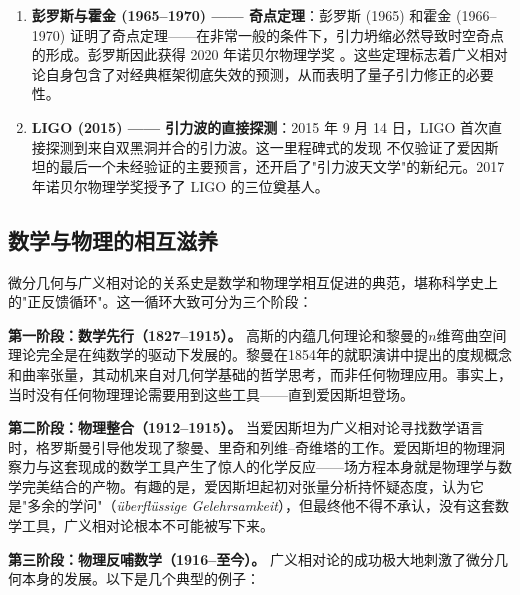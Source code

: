 \begin{enumerate}
    \item \textbf{彭罗斯与霍金 (1965--1970) —— 奇点定理}：彭罗斯 (1965) 和霍金 (1966--1970) 证明了奇点定理——在非常一般的条件下，引力坍缩必然导致时空奇点的形成。彭罗斯因此获得 2020 年诺贝尔物理学奖 \cite{Penrose1965}。这些定理标志着广义相对论自身包含了对经典框架彻底失效的预测，从而表明了量子引力修正的必要性。
    
    \item \textbf{LIGO (2015) —— 引力波的直接探测}：2015 年 9 月 14 日，LIGO 首次直接探测到来自双黑洞并合的引力波。这一里程碑式的发现 \cite{Abbott2016} 不仅验证了爱因斯坦的最后一个未经验证的主要预言，还开启了"引力波天文学"的新纪元。2017 年诺贝尔物理学奖授予了 LIGO 的三位奠基人。
\end{enumerate}

\subsection{数学与物理的相互滋养}

微分几何与广义相对论的关系史是数学和物理学相互促进的典范，堪称科学史上的"正反馈循环"。这一循环大致可分为三个阶段：

\medskip

\textbf{第一阶段：数学先行（1827--1915）。} 高斯的内蕴几何理论和黎曼的$n$维弯曲空间理论完全是在纯数学的驱动下发展的。黎曼在1854年的就职演讲中提出的度规概念和曲率张量，其动机来自对几何学基础的哲学思考，而非任何物理应用。事实上，当时没有任何物理理论需要用到这些工具——直到爱因斯坦登场。

\medskip

\textbf{第二阶段：物理整合（1912--1915）。} 当爱因斯坦为广义相对论寻找数学语言时，格罗斯曼引导他发现了黎曼、里奇和列维--奇维塔的工作。爱因斯坦的物理洞察力与这套现成的数学工具产生了惊人的化学反应——场方程本身就是物理学与数学完美结合的产物。有趣的是，爱因斯坦起初对张量分析持怀疑态度，认为它是"多余的学问"（\textit{überflüssige Gelehrsamkeit}），但最终他不得不承认，没有这套数学工具，广义相对论根本不可能被写下来。

\medskip

\textbf{第三阶段：物理反哺数学（1916--至今）。} 广义相对论的成功极大地刺激了微分几何本身的发展。以下是几个典型的例子：

